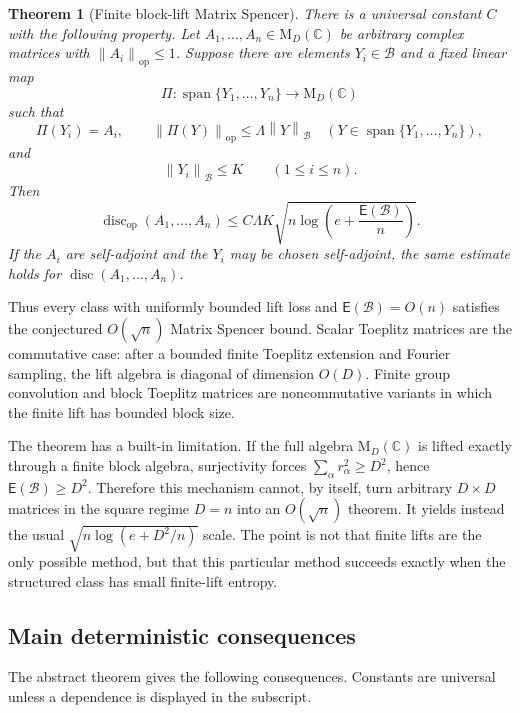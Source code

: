 \documentclass[11pt]{amsart}
\numberwithin{equation}{section}
\newtheorem{theorem}{Theorem}[section]
\theoremstyle{definition}
\theoremstyle{remark}
\newcommand{\C}{\mathbb C}
\newcommand{\M}{\mathrm M}
\newcommand{\op}{\mathrm{op}}
\newcommand{\Span}{\operatorname{span}}
\newcommand{\disc}{\operatorname{disc}}
\newcommand{\discop}{\operatorname{disc}_{\op}}
\newcommand{\Ent}{\mathsf E}
\newcommand{\norm}[1]{\left\lVert #1\right\rVert}
\newcommand{\mcB}{\mathcal B}
\begin{document}
\begin{theorem}[Finite block-lift Matrix Spencer]\label{thm:main}
There is a universal constant $C$ with the following property. Let
$A_1,\ldots,A_n\in \M_D(\C)$ be arbitrary complex matrices with
$\norm{A_i}_{\op}\le 1$. Suppose there are elements $Y_i\in\mcB$ and a fixed
linear map
\[
\Pi: \Span\{Y_1,\ldots,Y_n\}\longrightarrow \M_D(\C)
\]
such that
\[
\Pi(Y_i)=A_i,
\qquad
\norm{\Pi(Y)}_{\op}\le \Lambda\norm{Y}_{\mcB}
\quad (Y\in\Span\{Y_1,\ldots,Y_n\}),
\]
and
\[
\norm{Y_i}_{\mcB}\le K \qquad (1\le i\le n).
\]
Then
\[
\discop(A_1,\ldots,A_n)
\le C\Lambda K
\sqrt{n\log\left(e+\frac{\Ent(\mcB)}{n}\right)} .
\]
If the $A_i$ are self-adjoint and the $Y_i$ may be chosen self-adjoint, the
same estimate holds for $\disc(A_1,\ldots,A_n)$.
\end{theorem}

Thus every class with uniformly bounded lift loss and $\Ent(\mcB)=O(n)$
satisfies the conjectured $O(\sqrt n)$ Matrix Spencer bound. Scalar Toeplitz
matrices are the commutative case: after a bounded finite Toeplitz extension and
Fourier sampling, the lift algebra is diagonal of dimension $O(D)$. Finite group
convolution and block Toeplitz matrices are noncommutative variants in which the
finite lift has bounded block size.

The theorem has a built-in limitation. If the full algebra $\M_D(\C)$ is lifted
exactly through a finite block algebra, surjectivity forces
$\sum_\alpha r_\alpha^2\ge D^2$, hence $\Ent(\mcB)\ge D^2$. Therefore this
mechanism cannot, by itself, turn arbitrary $D\times D$ matrices in the square
regime $D=n$ into an $O(\sqrt n)$ theorem. It yields instead the usual
$\sqrt{n\log(e+D^2/n)}$ scale. The point is not that finite lifts are the only
possible method, but that this particular method succeeds exactly when the
structured class has small finite-lift entropy.

\subsection{Main deterministic consequences}

The abstract theorem gives the following consequences. Constants are universal
unless a dependence is displayed in the subscript.
\end{document}
